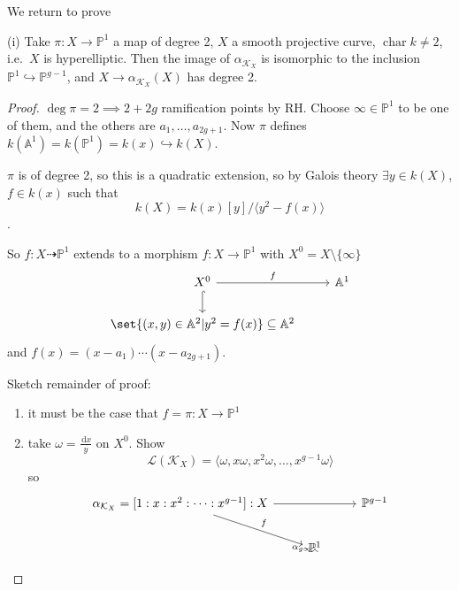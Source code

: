 \documentclass{article}
\newcommand{\A}{\mathbb{A}}
\newcommand{\proj}{\mathbb{P}}
\newcommand{\diff}{\,\textrm{d}}
\DeclareMathOperator{\chara}{char}
\begin{document}
We return to prove
\begin{prop}
    (i) Take $\pi:X \to \proj^1$ a map of degree 2, $X$ a smooth projective curve, $\chara k \neq 2$, i.e.\ $X$ is hyperelliptic.
    Then the image of $\alpha_{\mathcal{K}_X}$ is isomorphic to the inclusion $\proj^1 \hookrightarrow \proj^{g-1}$, and $X \to \alpha_{\mathcal{K}_X}(X)$ has degree 2.
\end{prop}
\begin{proof}
    $\deg \pi = 2 \implies 2 + 2g$ ramification points by RH. Choose $\infty \in \proj^1$ to be one of them, and the others are $a_1, \dotsc, a_{2g + 1}$.
    Now $\pi$ defines $k(\A^1) = k(\proj^1) = k(x) \hookrightarrow k(X)$.

    $\pi$ is of degree 2, so this is a quadratic extension, so by Galois theory $\exists y \in k(X)$, $f \in k(x)$ such that
    \begin{equation*}k(X) = k(x)[y]/\langle y^2 - f(x) \rangle\end{equation*}.

    So $f: X \dashrightarrow \proj^1$ extends to a morphism $f: X \to \proj^1$ with $X^0 = X \setminus \{\infty\}$
    \begin{equation*}
        \begin{tikzcd}
            X^0 \rar["f"] \dar[hook] & \A^1 \\
            \set{(x, y) \in \A^2 | y^2 = f(x)} \subseteq \A^2
        \end{tikzcd}
    \end{equation*}
    and $f(x) = (x - a_1) \dotsm (x - a_{2g+1})$.

    Sketch remainder of proof:
    \begin{enumerate}[label=\arabic*)]
        \item it must be the case that $f=\pi: X \to \proj^1$
        \item take $\omega = \frac{\diff x}{y}$ on $X^0$. Show
            \begin{equation*}
                \mathcal{L}(\mathcal{K}_X) = \langle \omega, x\omega, x^2 \omega, \dotsc, x^{g-1} \omega \rangle
            \end{equation*}
            so
            \begin{equation*}
                \begin{tikzcd}
                    \alpha_{\mathcal{K}_X} = [1:x:x^2:\dotsb:x^{g-1}]: X \ar[rr] \ar[rd, "f"] && \proj^{g-1} \\
                                                                                              & \proj^1 \ar["\alpha_{g \infty}"]
                \end{tikzcd} \qedhere
            \end{equation*}
    \end{enumerate}
\end{proof}
\end{document}
